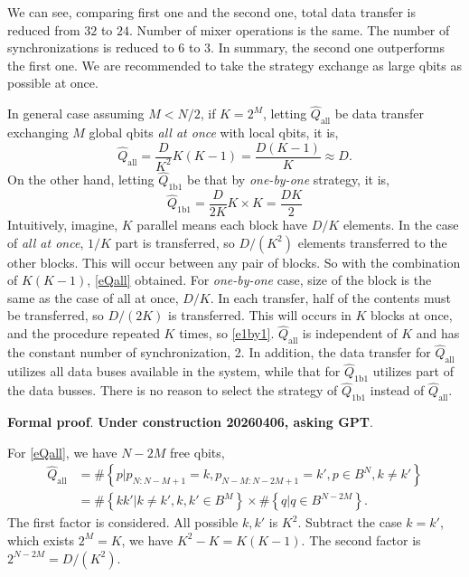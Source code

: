 \documentclass[a4paper]{article}
\newcommand{\eqlabel}[1]{\label{#1}}
\newcommand{\cbr}[1]{\left\{#1\right\}}
\begin{document}
We can see, comparing first one and the second one, total data transfer is reduced from \(32\) to \(24\). Number of mixer operations is the same. The number of synchronizations is reduced to \(6\) to \(3\). In summary, the second one outperforms the first one. We are recommended to take the strategy exchange as large qbits as possible at once. 

In general case assuming \(M < N/2\), if \(K=2^M\), letting \(\hat{Q}_{\text{all}}\) be data transfer exchanging \(M\) global qbits \textit{all at once} with local qbits, it is, 
\begin{equation}
    \eqlabel{eQall}
    \hat{Q}_{\text{all}} = \frac{D}{K^2} K (K-1) = \frac{D(K-1)}{K} \approx D.
\end{equation}
On the other hand, letting \(\hat{Q}_{\text{1b1}}\) be that by \textit{one-by-one} strategy, it is,
\begin{equation}
    \eqlabel{e1by1}
    \hat{Q}_{\text{1b1}} = \frac{D}{2K} K\times K = \frac{DK}{2}
\end{equation}
Intuitively, imagine, \(K\) parallel means each block have \(D/K\) elements. In the case of \textit{all at once}, \(1/K\) part is transferred, so \(D/(K^2)\) elements transferred to the other blocks. This will occur between any pair of blocks. So with the combination of \(K(K-1)\), \eqref{eQall} obtained. For \textit{one-by-one} case, size of the block is the same as the case of all at once, \(D/K\). In each transfer, half of the contents must be transferred, so \(D/(2K)\) is transferred. This will occurs in \(K\) blocks at once, and the procedure repeated \(K\) times, so \eqref{e1by1}. \(\hat{Q}_{\text{all}}\) is independent of \(K\) and has the constant number of synchronization, 2. In addition, the data transfer for \(\hat{Q}_{\text{all}}\) utilizes all data buses available in the system, while that for \(\hat{Q}_{\text{1b1}}\) utilizes part of the data busses. There is no reason to select the strategy of \(\hat{Q}_{\text{1b1}}\) instead of \(\hat{Q}_{\text{all}}\).
 
\textbf{Formal proof}. \textbf{Under construction 20260406, asking GPT}.

For \eqref{eQall}, we have \(N-2M\) free qbits, 
\begin{align*}
 \hat{Q}_{\text{all}} &= \# \cbr{p| p_{N:N-M+1} = k, p_{N-M:N-2M+1} = k', p\in B^N, k\neq k'} \\
&= \# \cbr{kk'| k\neq k', k, k'\in B^M}\times\# \cbr{q|q\in B^{N-2M}}.
\end{align*}
The first factor is considered. All possible \(k, k'\) is \(K^2\). Subtract the case \(k=k'\), which exists \(2^M = K\), we have \(K^2 - K = K(K-1)\). The second factor is \(2^{N-2M} = D/(K^2)\).
\end{document}

